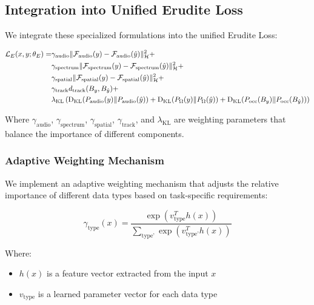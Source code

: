 \subsection{Integration into Unified Erudite Loss}

We integrate these specialized formulations into the unified Erudite Loss:

\begin{equation}
\begin{aligned}
\mathcal{L}_E(x, y; \theta_E) = &\gamma_{\text{audio}} \|\mathcal{F}_{\text{audio}}(y) - \mathcal{F}_{\text{audio}}(\hat{y})\|_{\mathcal{H}}^2 + \\
&\gamma_{\text{spectrum}} \|\mathcal{F}_{\text{spectrum}}(y) - \mathcal{F}_{\text{spectrum}}(\hat{y})\|_{\mathcal{H}}^2 + \\
&\gamma_{\text{spatial}} \|\mathcal{F}_{\text{spatial}}(y) - \mathcal{F}_{\text{spatial}}(\hat{y})\|_{\mathcal{H}}^2 + \\
&\gamma_{\text{track}} d_{\text{track}}(B_y, B_{\hat{y}}) + \\
&\lambda_{\text{KL}} \left( \mathrm{D_{KL}}(P_{\text{audio}}(y) \| P_{\text{audio}}(\hat{y})) + \mathrm{D_{KL}}(P_{\Omega}(y) \| P_{\Omega}(\hat{y})) + \mathrm{D_{KL}}(P_{\text{occ}}(B_y) \| P_{\text{occ}}(B_{\hat{y}})) \right)
\end{aligned}
\end{equation}

Where $\gamma_{\text{audio}}$, $\gamma_{\text{spectrum}}$, $\gamma_{\text{spatial}}$, $\gamma_{\text{track}}$, and $\lambda_{\text{KL}}$ are weighting parameters that balance the importance of different components.

\subsubsection{Adaptive Weighting Mechanism}

We implement an adaptive weighting mechanism that adjusts the relative importance of different data types based on task-specific requirements:

\begin{equation}
\gamma_{\text{type}}(x) = \frac{\exp(v_{\text{type}}^T h(x))}{\sum_{\text{type'}} \exp(v_{\text{type'}}^T h(x))}
\end{equation}

Where:
\begin{itemize}
\item $h(x)$ is a feature vector extracted from the input $x$
\item $v_{\text{type}}$ is a learned parameter vector for each data type
\end{itemize}

